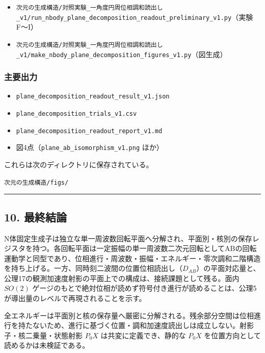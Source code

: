 \documentclass[
  a4paper,
]{ltjsarticle}
\providecommand{\tightlist}{%
  \setlength{\itemsep}{0pt}\setlength{\parskip}{0pt}}
\begin{document}
\begin{itemize}
\tightlist
\item
  \texttt{次元の生成構造/対照実験\_一角度円周位相調和読出し\_v1/run\_nbody\_plane\_decomposition\_readout\_preliminary\_v1.py}（実験F〜I）
\item
  \texttt{次元の生成構造/対照実験\_一角度円周位相調和読出し\_v1/make\_nbody\_plane\_decomposition\_figures\_v1.py}（図生成）
\end{itemize}

\subsubsection{主要出力}\label{ux4e3bux8981ux51faux529b}

\begin{itemize}
\tightlist
\item
  \texttt{plane\_decomposition\_readout\_result\_v1.json}
\item
  \texttt{plane\_decomposition\_trials\_v1.csv}
\item
  \texttt{plane\_decomposition\_readout\_report\_v1.md}
\item
  図4点（\texttt{plane\_ab\_isomorphism\_v1.png} ほか）
\end{itemize}

これらは次のディレクトリに保存されている。

\texttt{次元の生成構造/figs/}

\begin{center}\rule{0.5\linewidth}{0.5pt}\end{center}

\subsection{10. 最終結論}\label{ux6700ux7d42ux7d50ux8ad6}

N体固定生成子は独立な単一周波数回転平面へ分解され、平面別・核別の保存レジスタを持つ。各回転平面は一定振幅の単一周波数二次元回転としてABの回転運動学と同型であり、位相進行・周波数・振幅・エネルギー・零次調和二階構造を持ち上げる。一方、同時刻二波間の位置位相読出し（\(D_{AB}\)）の平面対応量と、公理17の観測加速度射影の平面上での構成は、接続課題として残る。面内
\(SO(2)\)
ゲージのもとで絶対位相が読めず符号付き進行が読めることは、公理5が導出量のレベルで再現されることを示す。

全エネルギーは平面別と核の保存量へ厳密に分解される。残余部分空間は位相進行を持たないため、進行に基づく位置・調和加速度読出しは成立しない。射影子・核二乗量・状態射影
\(P_0X\) は共変に定義でき、静的な \(P_0X\)
を位置方向として読めるかは未検証である。
\end{document}
